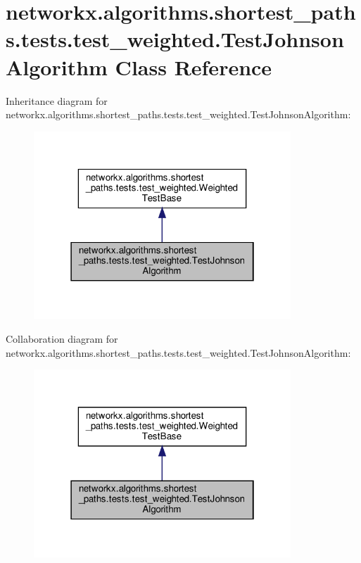 \hypertarget{classnetworkx_1_1algorithms_1_1shortest__paths_1_1tests_1_1test__weighted_1_1TestJohnsonAlgorithm}{}\section{networkx.\+algorithms.\+shortest\+\_\+paths.\+tests.\+test\+\_\+weighted.\+Test\+Johnson\+Algorithm Class Reference}
\label{classnetworkx_1_1algorithms_1_1shortest__paths_1_1tests_1_1test__weighted_1_1TestJohnsonAlgorithm}


Inheritance diagram for networkx.\+algorithms.\+shortest\+\_\+paths.\+tests.\+test\+\_\+weighted.\+Test\+Johnson\+Algorithm\+:
\nopagebreak
\begin{figure}[H]
\begin{center}
\leavevmode
\includegraphics[width=274pt]{classnetworkx_1_1algorithms_1_1shortest__paths_1_1tests_1_1test__weighted_1_1TestJohnsonAlgorithm__inherit__graph}
\end{center}
\end{figure}


Collaboration diagram for networkx.\+algorithms.\+shortest\+\_\+paths.\+tests.\+test\+\_\+weighted.\+Test\+Johnson\+Algorithm\+:
\nopagebreak
\begin{figure}[H]
\begin{center}
\leavevmode
\includegraphics[width=274pt]{classnetworkx_1_1algorithms_1_1shortest__paths_1_1tests_1_1test__weighted_1_1TestJohnsonAlgorithm__coll__graph}
\end{center}
\end{figure}
